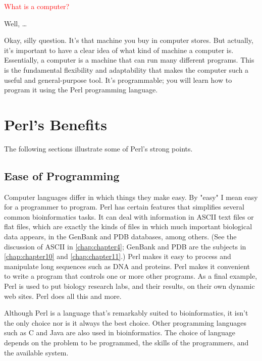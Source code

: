 \textcolor{red}{What is a computer?}

\begin{adjustwidth}{1cm}{}
Well, \ldots

Okay, silly question. It's that machine you buy in computer stores. But actually, it's important to have a clear idea of what kind of machine a computer is. Essentially, a computer is a machine that can run many different programs. This is the fundamental flexibility and adaptability that makes the computer such a useful and general-purpose tool. It's programmable; you will learn how to program it using the Perl programming language. 
\end{adjustwidth}

\section{Perl's Benefits}
The following sections illustrate some of Perl's strong points.

\subsection{Ease of Programming}
Computer languages differ in which things they make easy. By "easy" I mean easy for a programmer to program. Perl has certain features that simplifies several common bioinformatics tasks. It can deal with information in ASCII text files or flat files, which are exactly the kinds of files in which much important biological data appears, in the GenBank and PDB databases, among others. (See the discussion of ASCII in \autoref{chap:chapter4}; GenBank and PDB are the subjects in \autoref{chap:chapter10} and \autoref{chap:chapter11}.) Perl makes it easy to process and manipulate long sequences such as DNA and proteins. Perl makes it convenient to write a program that controls one or more other programs. As a final example, Perl is used to put biology research labs, and their results, on their own dynamic web sites. Perl does all this and more.

Although Perl is a language that's remarkably suited to bioinformatics, it isn't the only choice nor is it always the best choice. Other programming languages such as C and Java are also used in bioinformatics. The choice of language depends on the problem to be programmed, the skills of the programmers, and the available system.

